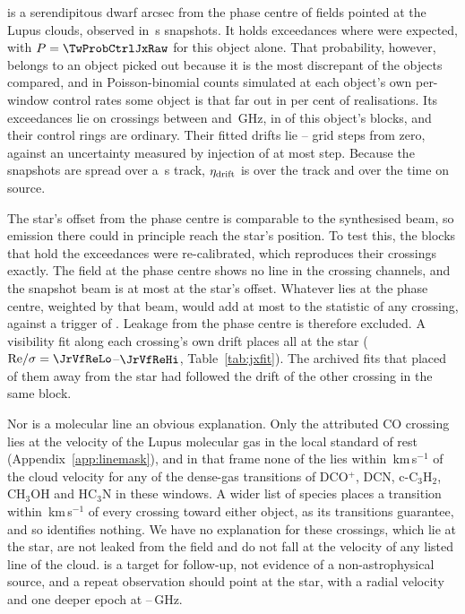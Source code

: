 \BkAlmaName{} is a serendipitous dwarf \TwPbJx{} arcsec from the phase
centre of fields pointed at the Lupus clouds, observed in \TwOnSrcJx\,s
snapshots. It holds \TwNExcJx{} exceedances where \TwExpCtrlJx{} were
expected, with $P=\TwProbCtrlJxRaw$ for this object alone. That probability,
however, belongs to an object picked out because it is the most discrepant of
the \TwLookNStarCtrl{} objects compared, and in Poisson-binomial counts
simulated at each object's own per-window control rates some object is that
far out in \TwLookPctCtrl{} per cent of realisations. Its
\TwNExcJxWord{} exceedances lie on \TwJxNCrossExcWord{} crossings between
\TwJxExcBandLo{} and \TwJxExcBandHi\,GHz, in \TwJxNBlockExcWord{} of this
object's \TwJxNBlockWord{} blocks, and their control rings are ordinary.
Their fitted drifts lie \TwJxStepLo--\TwJxStepHi{} grid steps from zero,
against an uncertainty measured by injection of at most \TwJxStepErr{} step.
Because the snapshots are spread over a \TwJxSpanS\,s track,
$\eta_{\rm drift}$ is \TwJxEtaSpanRange{} over the track and \TwJxEtaOnRange{}
over the time on source.

The star's offset from the phase centre is comparable to the synthesised
beam, so emission there could in principle reach the star's position. To test this, the
\TwJxNBlockExcWord{} blocks that hold the exceedances were re-calibrated,
which reproduces their \TwJxNCrossExcWord{} crossings exactly. The field at
the phase centre shows no line in the crossing channels, and the snapshot beam
is at most \JrBeamAbsMax{} at the star's offset. Whatever lies at the phase
centre, weighted by that beam, would add at most \JrLeakTMax{} to the
statistic of any crossing, against a trigger of \StageNullTrig. Leakage from the phase
centre is therefore excluded. A visibility fit along each crossing's own drift places
all \TwJxNCrossExcWord{} at the star (${\rm Re}/\sigma=\JrVfReLo$--$\JrVfReHi$,
Table~\ref{tab:jxfit}). The archived fits that placed
\JrVfNWrongDriftWord{} of them away from the star had followed the drift of
the other crossing in the same block.

Nor is a molecular line an obvious explanation. Only the attributed CO
crossing lies at the velocity of the Lupus molecular gas in the local
standard of rest (Appendix~\ref{app:linemask}), and in that frame none of
the \TwJxNCrossExcWord{} lies within \JqLineMinDv\,km\,s$^{-1}$ of the cloud velocity for
any of the \JqLineNList{} dense-gas transitions of DCO$^+$, DCN,
c-C$_3$H$_2$, CH$_3$OH and HC$_3$N in these windows. A wider list of
\TwWideNSpecies{} species places a transition within
\TwWideDvMax\,km\,s$^{-1}$ of every crossing toward either object, as its
\TwWideNTrans{} transitions guarantee, and so identifies nothing. We have no
explanation for these crossings, which lie at the star, are not leaked from
the field and do not fall at the velocity of any listed line of the cloud.
\BkAlmaName{} is a target for follow-up, not evidence of a
non-astrophysical source, and a repeat observation should point at the
star, with a radial velocity and one deeper epoch at
\TwJxExcBandLo--\TwJxExcBandHi\,GHz.

